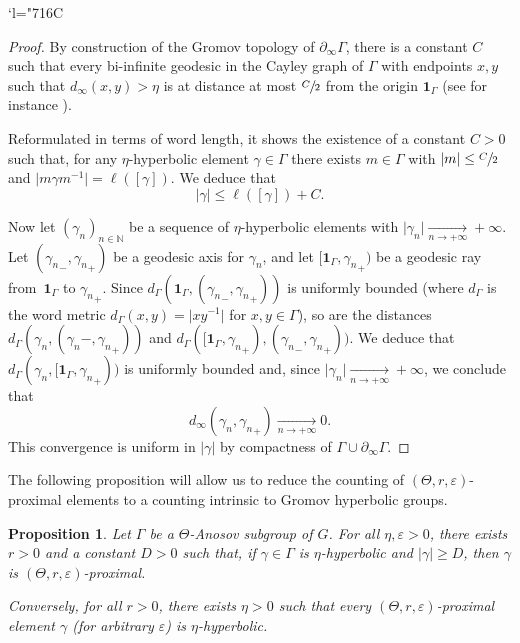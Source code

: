 \documentclass[JEP,XML,SOM,Unicode,NoEqCountersInSection,NoFloatCountersInSection,published]{cedram}
\newcommand{\Changelback}{\mathcode`l="716C}
\newtheorem{prop}[theo]{Proposition}
\theoremstyle{definition}
\let\epsilon\varepsilon
\let\G\Gamma
\let\g\gamma
\begin{document}
\Changelback

\begin{proof}
By construction of the Gromov topology of $\partial_\infty \Gamma$, there is a constant $C$ such that every bi-infinite geodesic in the Cayley graph of $\G$ with endpoints $x,y$ such that $d_\infty(x,y)>\eta$ is at distance at most $\sfrac{C}{2}$ from the origin $\mathbf 1_\G$ (see for instance \cite[Lem.\,7.1]{CK}).

Reformulated in terms of word length, it shows the existence of a constant $C>0$ such that, for any $\eta$-hyperbolic element $\g\in \G$ there exists $m\in \G$ with $\vert m \vert \leq \sfrac C 2$ and $\vert m\g m^{-1}\vert = \ell([\g])$. We deduce that
\[\vert \g \vert \leq \ell([\g])+ C.\]

Now let $(\g_n)_{n\in\mathbb N}$ be a sequence of $\eta$-hyperbolic elements with $\vert \g_n \vert \underset{n\to +\infty}{\longrightarrow} +\infty$. Let $({\gamma_n}_-, {\gamma_n}_+)$ be a geodesic axis for $\gamma_n$, and let $[\mathbf 1_\G, {\gamma_n}_+)$ be a geodesic ray from~$\mathbf 1_\G$ to ${\gamma_n}_+$. Since $d_\G(\mathbf 1_\G, ({\gamma_n}_-, {\gamma_n}_+))$ is uniformly bounded (where $d_\G$ is the word metric $d_\G(x,y)=\vert xy^{-1}\vert$ for $x,y\in \G$), so are the distances $d_\G(\gamma_n, ({\gamma_n}-, {\gamma_n}_+))$ and $d_\G([\mathbf 1_\G, {\gamma_n}_+), ({\gamma_n}_-, {\gamma_n}_+))$. We deduce that $d_\G(\gamma_n, [\mathbf 1_\G, {\gamma_n}_+))$ is uniformly bounded and, since $\vert \gamma_n \vert \underset{n\to +\infty}{\longrightarrow} +\infty$, we conclude that \[d_\infty(\gamma_n, {\gamma_n}_+)\underset{n\to +\infty}{\longrightarrow} 0.\]
This convergence is uniform in $\vert \gamma \vert$ by compactness of $\Gamma \cup \partial_\infty \Gamma$.
\end{proof}

The following proposition will allow us to reduce the counting of $(\Theta,r,\epsilon)$-proximal elements to a counting intrinsic to Gromov hyperbolic groups.

\begin{prop} \label{prop - Proximal VS Hyperbolic}
Let $\Gamma$ be a $\Theta$-Anosov subgroup of $G$. For all $\eta,\epsilon>0$, there exists $r>0$ and a constant $D>0$ such that, if $\gamma \in \Gamma$ is $\eta$-hyperbolic and $\vert \gamma \vert \geq D$, then $\gamma$ is $(\Theta,r,\epsilon)$-proximal.

Conversely, for all $r>0$, there exists $\eta>0$ such that every $(\Theta,r,\epsilon)$-proximal element $\gamma$ (for arbitrary $\epsilon$) is $\eta$-hyperbolic.
\end{prop}
\end{document}
